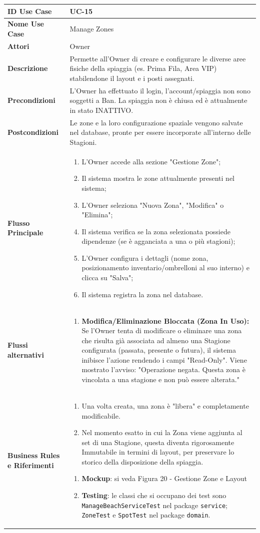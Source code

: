 \documentclass{article}
\newcommand{\usecasetable}[9]{
	\begin{table}[h!]
		\centering
		\footnotesize
		\renewcommand{\arraystretch}{1.4}
		\begin{tabularx}{\textwidth}{|l|>{\raggedright\arraybackslash}X|}
			\hline
			\textbf{ID Use Case} & #1 \\ \hline
			\textbf{Nome Use Case} & #2 \\ \hline
			\textbf{Attori} & #3 \\ \hline
			\textbf{Descrizione} & #4 \\ \hline
			\textbf{Precondizioni} & #5 \\ \hline
			\textbf{Postcondizioni} & #6 \\ \hline
			\textbf{Flusso Principale} & #7 \\ \hline
			\textbf{Flussi alternativi} & #8 \\ \hline
			\textbf{Business Rules e Riferimenti} & #9 \\ \hline
		\end{tabularx}
	\end{table}
}
\begin{document}
	\usecasetable
	{UC-15}
	{Manage Zones}
	{Owner}
	{Permette all'Owner di creare e configurare le diverse aree fisiche della spiaggia (es. Prima Fila, Area VIP) stabilendone il layout e i posti assegnati.}
	{L'Owner ha effettuato il login, l'account/spiaggia non sono soggetti a Ban. La spiaggia non è chiusa ed è attualmente in stato INATTIVO.}
	{Le zone e la loro configurazione spaziale vengono salvate nel database, pronte per essere incorporate all'interno delle Stagioni.}
	{
		\begin{enumerate}[nosep, leftmargin=*]
			\item L'Owner accede alla sezione "Gestione Zone";
			\item Il sistema mostra le zone attualmente presenti nel sistema;
			\item L'Owner seleziona "Nuova Zona", "Modifica" o "Elimina";
			\item Il sistema verifica se la zona selezionata possiede dipendenze (se è agganciata a una o più stagioni);
			\item L'Owner configura i dettagli (nome zona, posizionamento inventario/ombrelloni al suo interno) e clicca su "Salva";
			\item Il sistema registra la zona nel database.
		\end{enumerate}
	}
	{
		\begin{enumerate}[nosep, leftmargin=25px]
			\item[\textbf{4a-e.}] \textbf{Modifica/Eliminazione Bloccata (Zona In Uso):} Se l'Owner tenta di modificare o eliminare una zona che risulta già associata ad almeno una Stagione configurata (passata, presente o futura), il sistema inibisce l'azione rendendo i campi "Read-Only". Viene mostrato l'avviso: "Operazione negata. Questa zona è vincolata a una stagione e non può essere alterata."
		\end{enumerate}
	}
	{
		\begin{enumerate}[nosep, leftmargin=*]
			\item[•] Una volta creata, una zona è "libera" e completamente modificabile.
			\item[•] Nel momento esatto in cui la Zona viene aggiunta al set di una Stagione, questa diventa rigorosamente Immutabile in termini di layout, per preservare lo storico della disposizione della spiaggia.
		\end{enumerate}
		
		\begin{enumerate}[leftmargin=*]
			\item[•] \textbf{Mockup}: si veda Figura 20 - Gestione Zone e Layout
			
			\item[•] \textbf{Testing}: le classi che si occupano dei test sono \texttt{ManageBeachServiceTest} nel package \texttt{service}; \texttt{ZoneTest} e \texttt{SpotTest} nel package \texttt{domain}.
		\end{enumerate}
	}
		
\end{document}
